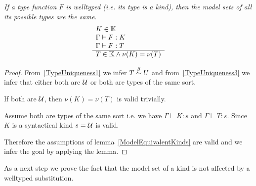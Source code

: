 \begin{theorem}
    \label{ModelAllTypesSame}
    \emph{If a type function $F$ is welltyped (i.e. its type is a kind), then
    the model sets of all its possible types are the same}.
    $$
    \begin{array}{l} 
        K \in \mathbb{K}
        \\
        \Gamma \vdash F: K
        \\
        \Gamma \vdash F: T
     \\ \hline 
        T \in \mathbb{K} \land \nu(K) = \nu(T)
    \end{array}
    $$

    \begin{proof}
        From~\ref{TypeUniqueness1} we infer $T \stackrel{\beta}{\sim} U$ and
        from~\ref{TypeUniqueness3} we infer that either both are ${\cal U}$ or both
        are types of the same sort.

        If both are ${\cal U}$, then $\nu(K) = \nu(T)$ is valid trivially.

        Assume both are types of the same sort i.e. we have $\Gamma \vdash K: s$
        and $\Gamma \vdash T: s$. Since $K$ is a syntactical kind $s = {\cal U}$ is
        valid.

        Therefore the assumptions of lemma~\ref{ModelEquivalentKinds} are valid
        and we infer the goal by applying the lemma.
    \end{proof}
\end{theorem}



As a next step we prove the fact that the model set of a kind is not affected by
a welltyped substitution.


